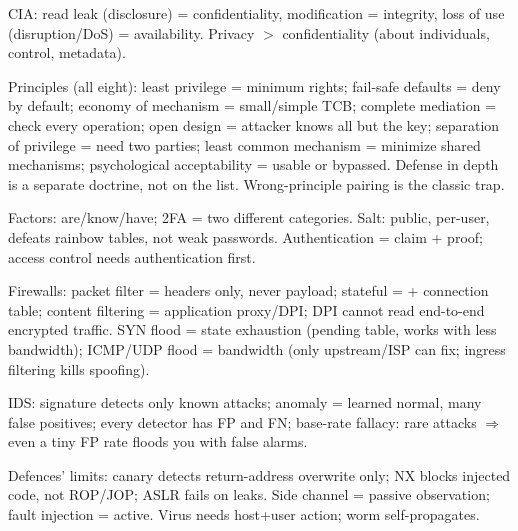 \documentclass[12pt, a4paper]{article}
\begin{document}
\begin{theorybox}
\begin{tightitem}
    \item CIA: read leak (disclosure) = confidentiality, modification = integrity, loss of use (disruption/DoS) = availability. Privacy $>$ confidentiality (about individuals, control, metadata).
    \item Principles (all eight): least privilege = minimum rights; fail-safe defaults = deny by default; economy of mechanism = small/simple TCB; complete mediation = check every operation; open design = attacker knows all but the key; separation of privilege = need two parties; least common mechanism = minimize shared mechanisms; psychological acceptability = usable or bypassed. Defense in depth is a separate doctrine, not on the list. Wrong-principle pairing is the classic trap.
    \item Factors: are/know/have; 2FA = two different categories. Salt: public, per-user, defeats rainbow tables, not weak passwords. Authentication = claim + proof; access control needs authentication first.
    \item Firewalls: packet filter = headers only, never payload; stateful = + connection table; content filtering = application proxy/DPI; DPI cannot read end-to-end encrypted traffic. SYN flood = state exhaustion (pending table, works with less bandwidth); ICMP/UDP flood = bandwidth (only upstream/ISP can fix; ingress filtering kills spoofing).
    \item IDS: signature detects only known attacks; anomaly = learned normal, many false positives; every detector has FP and FN; base-rate fallacy: rare attacks $\Rightarrow$ even a tiny FP rate floods you with false alarms.
    \item Defences' limits: canary detects return-address overwrite only; NX blocks injected code, not ROP/JOP; ASLR fails on leaks. Side channel = passive observation; fault injection = active. Virus needs host+user action; worm self-propagates.
\end{tightitem}
\end{theorybox}
\end{document}
